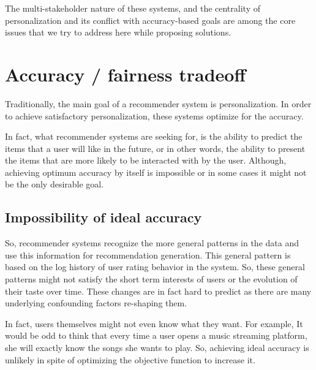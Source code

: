 The multi-stakeholder nature of these systems, and the centrality of personalization and its conflict with accuracy-based goals are among the core issues that we try to address here while proposing solutions.

\section{Accuracy / fairness tradeoff}

Traditionally, the main goal of a recommender system is personalization. In order to achieve satisfactory personalization, these systems optimize for the accuracy.

In fact, what recommender systems are seeking for, is the ability to predict the items that a user will like in the future, or in other words, the ability to present the items that are more likely to be interacted with by the user. Although, achieving optimum accuracy by itself is impossible or in some cases it might not be the only desirable goal.

\subsection{Impossibility of ideal accuracy}
So, recommender systems recognize the more general patterns in the data and use this information for recommendation generation. This general pattern is based on the log history of user rating behavior in the system. So, these general patterns might not satisfy the short term interests of users or the evolution of their taste over time. These changes are in fact hard to predict as there are many underlying confounding factors re-shaping them.

In fact, users themselves might not even know what they want. For example, It would be odd to think that every time a user opens a music streaming platform, she will exactly know the songs she wants to play. So, achieving ideal accuracy is unlikely in spite of optimizing the objective function to increase it.


